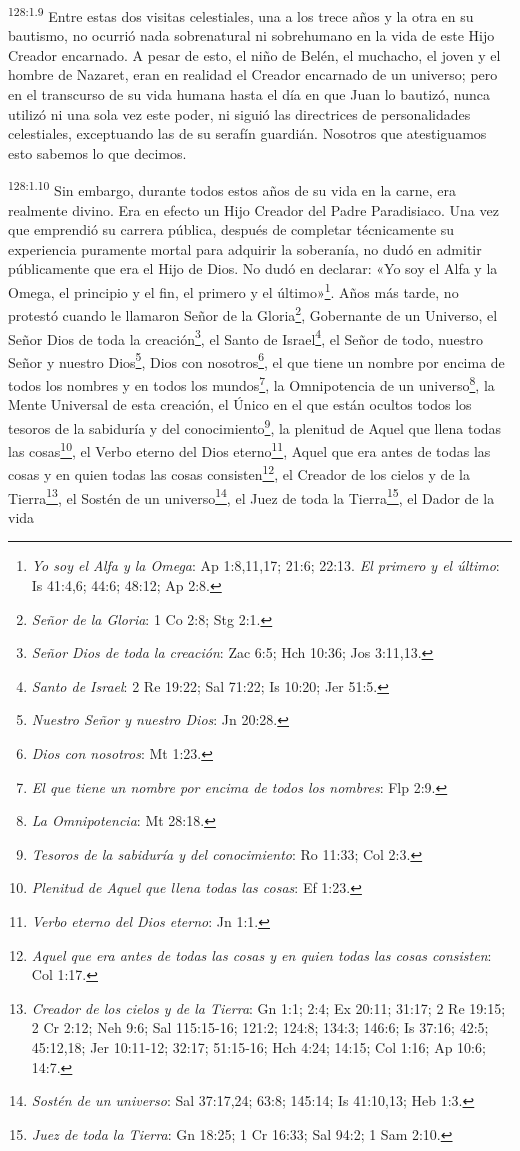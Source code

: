 \par
\textsuperscript{128:1.9} Entre estas dos visitas celestiales, una a los trece años y la otra en su bautismo, no ocurrió nada sobrenatural ni sobrehumano en la vida de este Hijo Creador encarnado. A pesar de esto, el niño de Belén, el muchacho, el joven y el hombre de Nazaret, eran en realidad el Creador encarnado de un universo; pero en el transcurso de su vida humana hasta el día en que Juan lo bautizó, nunca utilizó ni una sola vez este poder, ni siguió las directrices de personalidades celestiales, exceptuando las de su serafín guardián. Nosotros que atestiguamos esto sabemos lo que decimos.

\par
\textsuperscript{128:1.10} Sin embargo, durante todos estos años de su vida en la carne, era realmente divino. Era en efecto un Hijo Creador del Padre Paradisiaco. Una vez que emprendió su carrera pública, después de completar técnicamente su experiencia puramente mortal para adquirir la soberanía, no dudó en admitir públicamente que era el Hijo de Dios. No dudó en declarar: «Yo soy el Alfa y la Omega, el principio y el fin, el primero y el último»\footnote{\textit{Yo soy el Alfa y la Omega}: Ap 1:8,11,17; 21:6; 22:13. \textit{El primero y el último}: Is 41:4,6; 44:6; 48:12; Ap 2:8.}. Años más tarde, no protestó cuando le llamaron Señor de la Gloria\footnote{\textit{Señor de la Gloria}: 1 Co 2:8; Stg 2:1.}, Gobernante de un Universo, el Señor Dios de toda la creación\footnote{\textit{Señor Dios de toda la creación}: Zac 6:5; Hch 10:36; Jos 3:11,13.}, el Santo de Israel\footnote{\textit{Santo de Israel}: 2 Re 19:22; Sal 71:22; Is 10:20; Jer 51:5.}, el Señor de todo, nuestro Señor y nuestro Dios\footnote{\textit{Nuestro Señor y nuestro Dios}: Jn 20:28.}, Dios con nosotros\footnote{\textit{Dios con nosotros}: Mt 1:23.}, el que tiene un nombre por encima de todos los nombres y en todos los mundos\footnote{\textit{El que tiene un nombre por encima de todos los nombres}: Flp 2:9.}, la Omnipotencia de un universo\footnote{\textit{La Omnipotencia}: Mt 28:18.}, la Mente Universal de esta creación, el Único en el que están ocultos todos los tesoros de la sabiduría y del conocimiento\footnote{\textit{Tesoros de la sabiduría y del conocimiento}: Ro 11:33; Col 2:3.}, la plenitud de Aquel que llena todas las cosas\footnote{\textit{Plenitud de Aquel que llena todas las cosas}: Ef 1:23.}, el Verbo eterno del Dios eterno\footnote{\textit{Verbo eterno del Dios eterno}: Jn 1:1.}, Aquel que era antes de todas las cosas y en quien todas las cosas consisten\footnote{\textit{Aquel que era antes de todas las cosas y en quien todas las cosas consisten}: Col 1:17.}, el Creador de los cielos y de la Tierra\footnote{\textit{Creador de los cielos y de la Tierra}: Gn 1:1; 2:4; Ex 20:11; 31:17; 2 Re 19:15; 2 Cr 2:12; Neh 9:6; Sal 115:15-16; 121:2; 124:8; 134:3; 146:6; Is 37:16; 42:5; 45:12,18; Jer 10:11-12; 32:17; 51:15-16; Hch 4:24; 14:15; Col 1:16; Ap 10:6; 14:7.}, el Sostén de un universo\footnote{\textit{Sostén de un universo}: Sal 37:17,24; 63:8; 145:14; Is 41:10,13; Heb 1:3.}, el Juez de toda la Tierra\footnote{\textit{Juez de toda la Tierra}: Gn 18:25; 1 Cr 16:33; Sal 94:2; 1 Sam 2:10.}, el Dador de la vida 